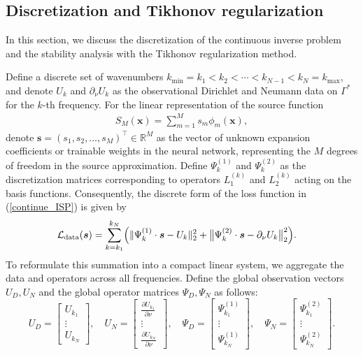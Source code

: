 \documentclass{article}
\theoremstyle{plain}
\theoremstyle{definition}
\begin{document}
\subsection{ {Discretization and Tikhonov regularization}}

 {In this section, we discuss the discretization of the continuous inverse problem and the stability analysis with the Tikhonov regularization method.}

 {
Define a discrete set of wavenumbers $k_{\text{min}}=k_1 < k_2 < \cdots < k_{N-1} < k_N=k_{\text{max}}$, and denote $U_k$ and ${\partial_\nu U_k}$ as the observational Dirichlet and Neumann data on $\Gamma^*$ for the $k$-th frequency. For the linear representation of the source function
\begin{align}
\label{linear}
    S_{M}(\boldsymbol{x})=\sum_{m=1}^{M} s_{m}\phi_{m}(\boldsymbol{x}),
\end{align}
denote $\boldsymbol{s} = (s_1, s_2, \dots, s_M)^\top \in \mathbb{R}^M$ as the vector of unknown expansion coefficients or trainable weights in the neural network, representing the $M$ degrees of freedom in the source approximation. Define $\Psi_k^{(1)}$ and $\Psi_k^{(2)}$ as the discretization matrices corresponding to operators $L_1^{(k)}$ and $L_2^{(k)}$ acting on the basis functions. Consequently, the discrete form of the loss function in (\ref{continue_ISP}) is given by
\begin{align}
    \label{loss_data}
    \mathcal{L}_{\text{data}}(\boldsymbol{s})&=\sum_{k=k_1}^{k_N} \Bigl(\|\Psi_k^{(1)}\cdot \boldsymbol{s} - U_k\|_2^2+\bigl\|\Psi_k^{(2)}\cdot \boldsymbol{s}  - {\partial_\nu U_k} \bigr\|_2^2\Bigr).
\end{align}
}
To reformulate this summation into a compact linear system, we aggregate the data and operators across all frequencies.  Define the global observation vectors $U_D, U_N$ and the global operator matrices $\Psi_D, \Psi_N$ as follows:
\[
U_D = \begin{bmatrix}
U_{k_1}\\
\vdots \\
U_{k_N}
\end{bmatrix},
\quad
U_N = \begin{bmatrix}
\frac{\partial U_{k_1}}{\partial \nu}\ \\
\vdots \\
\frac{\partial U_{k_N}}{\partial \nu}
\end{bmatrix},
\quad
\Psi_D= \begin{bmatrix}
\Psi_{k_1}^{(1)}\\
\vdots \\
\Psi_{k_N}^{(1)}
\end{bmatrix},
\quad
\Psi_N= \begin{bmatrix}
\Psi_{k_1}^{(2)}\\
\vdots \\
\Psi_{k_N}^{(2)}
\end{bmatrix}.
\]
\end{document}
